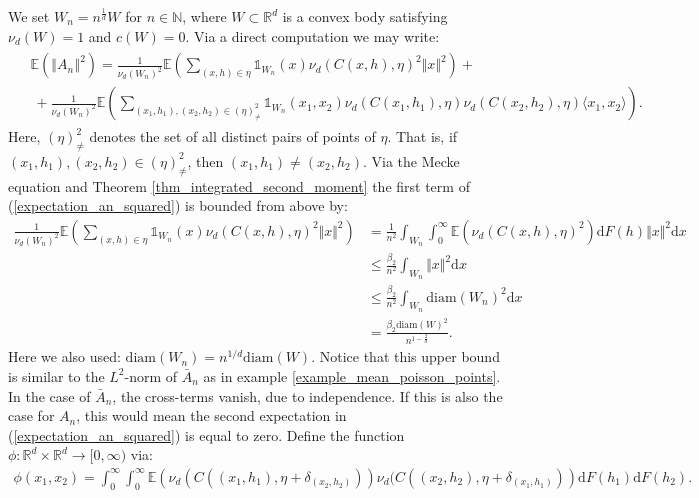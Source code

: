 \documentclass{article}
\newcommand{\NN}{\mathbb{N}}
\newcommand{\RR}{\mathbb{R}}
\newcommand{\EE}{\mathbb{E}}
\theoremstyle{plain}
\theoremstyle{remark}
\theoremstyle{definition}
\begin{document}
We set $W_n = n^\frac{1}{d}W$ for $n \in \NN$, where $W \subset \RR^d$ is a convex body satisfying $\nu_d(W) = 1$ and $c(W) = 0$. Via a direct computation we may write:
    \begin{align}
\begin{split}
    &\EE\left( \left\Vert A_n \right\Vert^2 \right) = \frac{1}{\nu_d(W_n)^2}\EE\left(\sum_{(x,h) \in \eta}\mathds{1}_{W_n}(x)\nu_d(C(x,h),\eta)^2\Vert x\Vert^2 \right) + \\
    & \ +\frac{1}{\nu_d(W_n)^2}\EE\left(\sum_{(x_1,h_1),(x_2,h_2) \in (\eta)_{\neq}^2}\mathds{1}_{W_n}(x_1,x_2)\nu_d(C(x_1,h_1),\eta)\nu_d(C(x_2,h_2),\eta)\langle x_1,x_2\rangle \right).
\end{split} \label{expectation_an_squared}
\end{align}
Here, $(\eta)_{\neq}^2$ denotes the set of all distinct pairs of points of $\eta$. That is, if $(x_1,h_1),(x_2,h_2) \in (\eta)_{\neq}^2$, then $(x_1,h_1) \neq (x_2,h_2)$.  Via the Mecke equation and Theorem \ref{thm_integrated_second_moment} the first term of (\ref{expectation_an_squared}) is bounded from above by:
\begin{align}
    \frac{1}{\nu_d(W_n)^2}\EE\left(\sum_{(x,h) \in \eta}\mathds{1}_{W_n}(x)\nu_d(C(x,h),\eta)^2\Vert x\Vert^2 \right) &= \frac{1}{n^2} \int_{W_n} \int_0^\infty \EE\left(\nu_d(C(x,h),\eta)^2 \right)\mathrm{d}F(h) \Vert x \Vert^2 \mathrm{d}x\nonumber\\
    &\leq \frac{\beta_2}{n^2} \int_{W_n} \Vert x \Vert^2 \mathrm{d}x\nonumber\\
    &\leq \frac{\beta_2}{n^2} \int_{W_n} \mathrm{diam}(W_n)^2 \mathrm{d}x\nonumber\\
    &= \frac{\beta_2 \mathrm{diam}(W)^2}{n^{1-\frac{2}{d}}}. \label{an_term1_l2_bound}
\end{align}
Here we also used: $\mathrm{diam}(W_n) = n^{1/d}\mathrm{diam}(W)$. Notice that this upper bound is similar to the $L^2$-norm of $\bar{A}_n$ as in example \ref{example_mean_poisson_points}. In the case of $\bar{A}_n$, the cross-terms vanish, due to independence. If this is also the case for $A_n$, this would mean the second expectation in (\ref{expectation_an_squared}) is equal to zero. Define the function $\phi : \RR^d \times \RR^d \to [0,\infty)$ via:
\begin{align*}
    \phi(x_1,x_2) = \int_0^\infty \int_0^\infty \EE\left(\nu_d(C((x_1,h_1),\eta+\delta_{(x_2,h_2)}))\nu_d(C((x_2,h_2),\eta+\delta_{(x_1,h_1)}) \right)\mathrm{d}F(h_1)\mathrm{d}F(h_2).
\end{align*}
\end{document}
